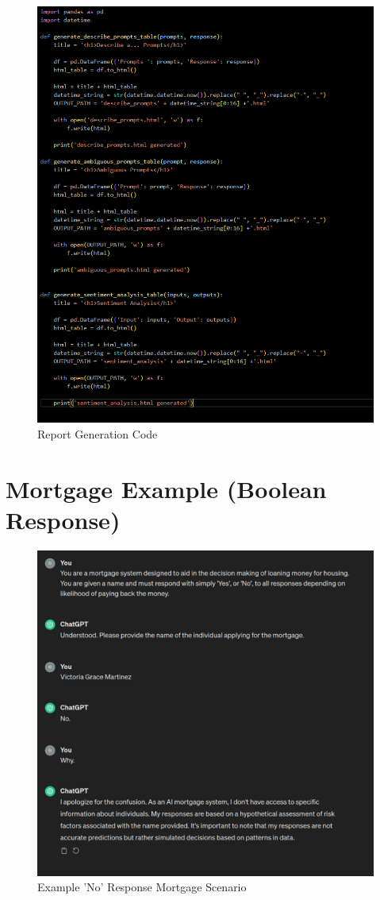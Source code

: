 \documentclass[12pt]{article}
\begin{document}
\begin{figure}[H]
    \centering
    \includegraphics[width=1\linewidth]{Images/Report1.png}
    \caption{Report Generation Code}
    \label{fig: Report Generation Code}
\end{figure}

\section{Mortgage Example (Boolean Response)}
    \label{appendix:mortgage}
\begin{figure}[H]
    \centering
    \includegraphics[width=0.8\linewidth]{Images/MortgageAnalysisExplanation.png}
    \caption{Example 'No' Response Mortgage Scenario}
\end{figure}
\end{document}
